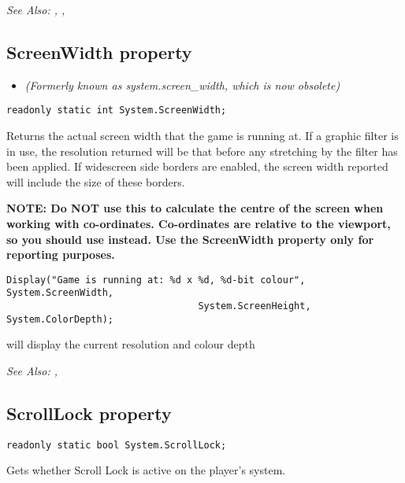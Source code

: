 \it{See Also:} ,
,


\subsection{ScreenWidth property}\label{System.ScreenWidth}%

\begin{itemize}
\item \it{(Formerly known as system.screen_width, which is now obsolete)}
\end{itemize}

\begin{verbatim}
readonly static int System.ScreenWidth;
\end{verbatim}
Returns the actual screen width that the game is running at.  If a graphic filter is in
use, the resolution returned will be that before any stretching by the filter has been
applied. If widescreen side borders are enabled, the screen width reported will include
the size of these borders.

\bf{NOTE:} Do \bf{NOT} use this to calculate the centre of the screen when working
with co-ordinates. Co-ordinates are relative to the viewport, so you should
use  instead. Use the ScreenWidth
property only for reporting purposes.

\begin{verbatim}
Display("Game is running at: %d x %d, %d-bit colour", System.ScreenWidth,
                                  System.ScreenHeight, System.ColorDepth);
\end{verbatim}
will display the current resolution and colour depth

\it{See Also:} ,


\subsection{ScrollLock property}\label{System.ScrollLock}%

\begin{verbatim}
readonly static bool System.ScrollLock;
\end{verbatim}
Gets whether Scroll Lock is active on the player's system.

